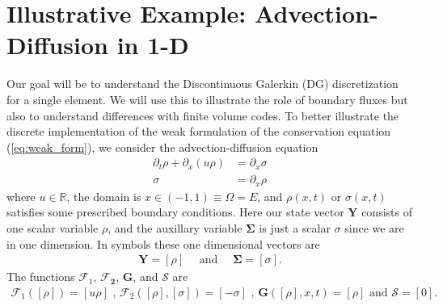 \documentclass{report}
\numberwithin{equation}{section}
\begin{document}
\section{Illustrative Example: Advection-Diffusion in 1-D}
\label{illustrative_example}
Our goal will be to understand the Discontinuous Galerkin (DG) discretization for a single element.  We will use this to illustrate the role of boundary fluxes but also to understand differences with finite volume codes. 
To better illustrate the discrete implementation of the weak formulation of the conservation equation (\ref{eq:weak_form}), we consider the advection-diffusion equation 
\begin{align}
    \partial_t \rho + \partial_x \left( u \rho \right) &= \partial_x \sigma \\
    \sigma &= \partial_x \rho
\end{align}
where $u \in \mathbb{R}$, the domain is $x \in (-1,  1) \equiv \Omega = E$, and $\rho(x,t)$ or $\sigma(x,t)$ satisfies some prescribed boundary conditions. Here our state vector $\bm{Y}$ consists of one scalar variable $\rho$, and the auxillary variable $\bm{\Sigma}$ is just a scalar $\sigma$ since we are in one dimension. In symbols these one dimensional vectors are
\begin{align}
    \bm{Y} = [\rho] \quad \text{ and }\quad  \bm{\Sigma} = [\sigma].
\end{align}
The functions $\bm{\mathcal{F}}_1$, $\bm{\mathcal{F}_2}$, $\bm{G}$, and $\bm{\mathcal{S}}$ are 
\begin{align}
   \bm{\mathcal{F}}_1([\rho]) = [ u \rho] \text{ , }
   \bm{\mathcal{F}}_2([\rho], [\sigma]) = [-\sigma ] \text{ , } \bm{G}([\rho], x, t) = [\rho] \text{ and }  \bm{\mathcal{S}} = [0] .
\end{align}
\end{document}

